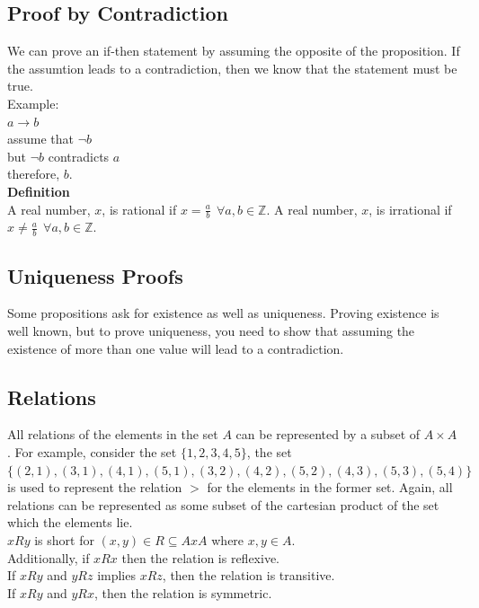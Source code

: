 \documentclass[a4paper,11pt]{article}
\begin{document}
\subsection{Proof by Contradiction}
We can prove an if-then statement by assuming the opposite of the proposition. If the assumtion leads to a contradiction, then we know that the statement must be true.\medskip\\
Example:\\
$a \rightarrow b$\\
assume that $\neg b$\\
but $\neg b$ contradicts $a$\\
therefore, $b$.\bigskip\\
\textbf{Definition}\\
A real number, $x$, is rational if $x=\frac{a}{b}~~\forall a,b \in \mathbb{Z}$.
A real number, $x$, is irrational if $x \neq \frac{a}{b}~~\forall a,b \in \mathbb{Z}$.

\textbf{}

\subsection{Uniqueness Proofs}
Some propositions ask for existence as well as uniqueness. Proving existence is
well known, but to prove uniqueness, you need to show that assuming the existence of more than one value will lead to a contradiction.

\subsection{Relations}
All relations of the elements in the set $A$ can be represented by a subset of $A \times A$. For example, consider the set $\{1,2,3,4,5\}$, the set\\
$\{(2,1), (3,1), (4,1), (5, 1), (3, 2), (4, 2), (5, 2), (4, 3), (5, 3), (5, 4)\}$\\ is used to represent the relation $>$ for the elements in the former set.
Again, all relations can be represented as some subset of the cartesian product of the set which the elements lie.\\
$xRy$ is short for $(x,y) \in R \subseteq AxA$ where $x, y \in A$.\\
Additionally, if $xRx$ then the relation is reflexive.\\
If $xRy$ and $yRz$ implies $xRz$, then the relation is transitive.\\
If $xRy$ and $yRx$, then the relation is symmetric.
\end{document}
